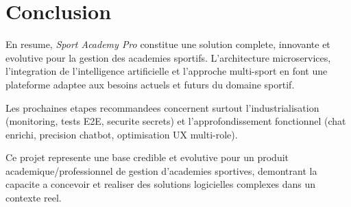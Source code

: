 \section{Conclusion}

En resume, \textit{Sport Academy Pro} constitue une solution complete, innovante et evolutive pour la gestion des academies sportifs. L'architecture microservices, l'integration de l'intelligence artificielle et l'approche multi-sport en font une plateforme adaptee aux besoins actuels et futurs du domaine sportif.

Les prochaines etapes recommandees concernent surtout l'industrialisation (monitoring, tests E2E, securite secrets) et l'approfondissement fonctionnel (chat enrichi, precision chatbot, optimisation UX multi-role).

Ce projet represente une base credible et evolutive pour un produit academique/professionnel de gestion d'academies sportives, demontrant la capacite a concevoir et realiser des solutions logicielles complexes dans un contexte reel.
